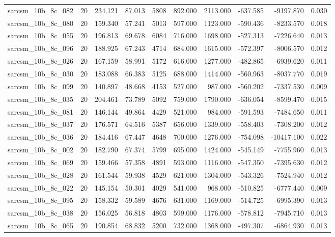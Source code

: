 \begin{tabular}{lrrrrrrrrr}
sarcsm\_10b\_8c\_082 & 20 & 234.121 & 87.013 & 5808 & 892.000 & 2113.000 & -637.585 & -9197.870 & 0.030 \\
sarcsm\_10b\_8c\_080 & 20 & 159.340 & 57.241 & 5013 & 597.000 & 1123.000 & -590.436 & -8233.570 & 0.018 \\
sarcsm\_10b\_8c\_055 & 20 & 196.813 & 69.678 & 6084 & 716.000 & 1698.000 & -527.313 & -7226.640 & 0.013 \\
sarcsm\_10b\_8c\_096 & 20 & 188.925 & 67.243 & 4714 & 684.000 & 1615.000 & -572.397 & -8006.570 & 0.012 \\
sarcsm\_10b\_8c\_026 & 20 & 167.159 & 58.991 & 5172 & 616.000 & 1277.000 & -482.865 & -6939.620 & 0.011 \\
sarcsm\_10b\_8c\_030 & 20 & 183.088 & 66.383 & 5125 & 688.000 & 1414.000 & -560.963 & -8037.770 & 0.019 \\
sarcsm\_10b\_8c\_099 & 20 & 140.897 & 48.668 & 4153 & 527.000 & 987.000 & -560.202 & -7337.530 & 0.009 \\
sarcsm\_10b\_8c\_035 & 20 & 204.461 & 73.789 & 5092 & 759.000 & 1790.000 & -636.054 & -8599.470 & 0.015 \\
sarcsm\_10b\_8c\_081 & 20 & 146.144 & 49.864 & 4429 & 521.000 & 984.000 & -591.593 & -7484.650 & 0.011 \\
sarcsm\_10b\_8c\_037 & 20 & 176.571 & 64.516 & 5387 & 656.000 & 1339.000 & -558.403 & -7308.200 & 0.012 \\
sarcsm\_10b\_8c\_036 & 20 & 184.416 & 67.447 & 4648 & 700.000 & 1276.000 & -754.098 & -10417.100 & 0.022 \\
sarcsm\_10b\_8c\_002 & 20 & 182.790 & 67.374 & 5799 & 695.000 & 1424.000 & -545.149 & -7755.960 & 0.013 \\
sarcsm\_10b\_8c\_069 & 20 & 159.466 & 57.358 & 4891 & 593.000 & 1116.000 & -547.350 & -7395.630 & 0.012 \\
sarcsm\_10b\_8c\_028 & 20 & 161.544 & 59.938 & 4529 & 621.000 & 1304.000 & -543.326 & -7524.940 & 0.012 \\
sarcsm\_10b\_8c\_022 & 20 & 145.154 & 50.301 & 4029 & 541.000 & 968.000 & -510.825 & -6777.440 & 0.009 \\
sarcsm\_10b\_8c\_095 & 20 & 158.332 & 59.589 & 4676 & 631.000 & 1169.000 & -514.725 & -6995.390 & 0.013 \\
sarcsm\_10b\_8c\_038 & 20 & 156.025 & 56.818 & 4803 & 599.000 & 1176.000 & -578.812 & -7945.710 & 0.013 \\
sarcsm\_10b\_8c\_065 & 20 & 190.854 & 68.832 & 5200 & 732.000 & 1368.000 & -497.307 & -6864.930 & 0.013 \\

\end{tabular}
